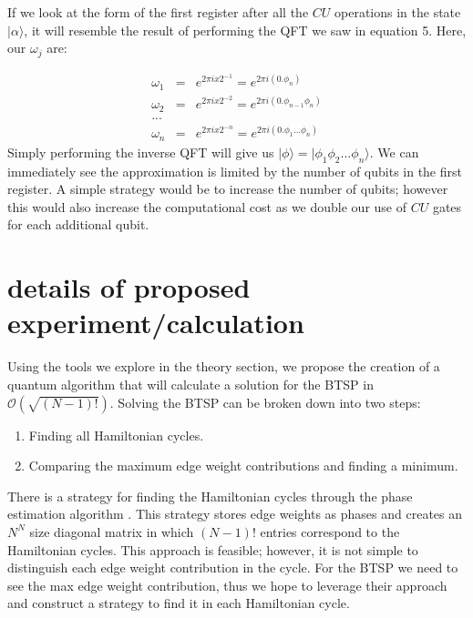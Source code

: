 \documentclass[twocolumn,showpacs,preprintnumbers,amsmath,amssymb]{revtex4}
\begin{document}
		If we look at the form of the first register after all the $CU$ operations in the state $|\alpha\rangle$, it will resemble the result of performing the QFT we saw in equation 5. Here, our $\omega_j$ are:
		
		\begin{eqnarray*}
			\omega_1 &=& e^{2\pi i x 2^{-1}} =  e^{2\pi i (0.\phi_n)}\\
			\omega_2 &=& e^{2\pi i x 2^{-2}} =  e^{2\pi i (0.\phi_{n-1}\phi_n)}\\
			...\\
			\omega_n &=& e^{2\pi i x 2^{-n}} =  e^{2\pi i (0.\phi_1...\phi_n)}
		\end{eqnarray*}
		Simply performing the inverse QFT will give us $|\phi\rangle =  |\phi_1\phi_2 ... \phi_n\rangle$.  We can immediately see the approximation is limited by the number of qubits in the first register. A simple strategy would be to increase the number of qubits; however this would also increase the computational cost as we double our use of $CU$ gates for each additional qubit.
		
		
		
		
		
		
		\section{details of proposed experiment/calculation}
		
		
		Using the tools we explore in the theory section, we propose the creation of a quantum algorithm that will calculate a solution for the BTSP in $\mathcal{O}(\sqrt{(N-1)!})$. Solving the BTSP can be broken down into two steps:
		
		\begin{enumerate}
			\item Finding all Hamiltonian cycles.
			\item Comparing the maximum edge weight contributions and finding a minimum.
		\end{enumerate}
		
		There is a strategy for finding the Hamiltonian cycles through the phase estimation algorithm \cite{srinivasan2018efficient}. This strategy stores edge weights as phases and creates an $N^N$ size diagonal matrix in which $(N-1)!$ entries correspond to the Hamiltonian cycles. This approach is feasible; however, it is not simple to distinguish each edge weight contribution in the cycle. For the BTSP we need to see the max edge weight contribution, thus we hope to leverage their approach and construct a strategy to find it in each Hamiltonian cycle.
		
\end{document}
